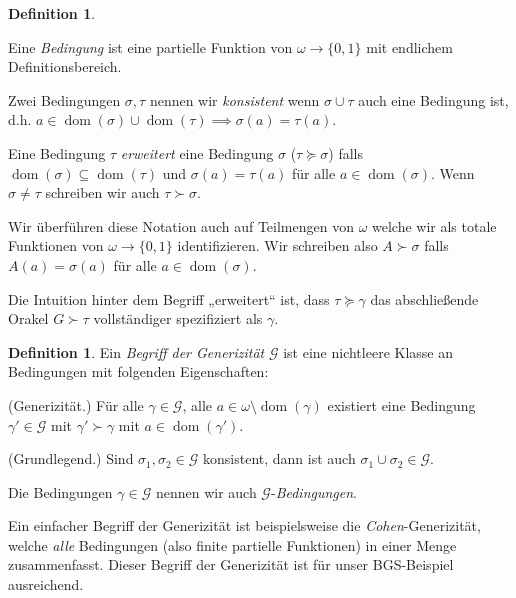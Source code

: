 \documentclass[nofonts]{uebung}
\theoremstyle{definition}
\newtheorem{definition}[theorem]{Definition}
\DeclareMathOperator{\dom}{dom}
\begin{document}
\begin{definition}\begin{thmenum}
    \item Eine \emph{Bedingung} ist eine partielle Funktion von $\omega \to \{0,1\}$ mit endlichem Definitionsbereich.
        \item Zwei Bedingungen $\sigma,\tau$ nennen wir \emph{konsistent} wenn $\sigma\cup\tau$ auch eine Bedingung ist, d.h. $a\in\dom(\sigma)\cup\dom(\tau)\implies \sigma(a)=\tau(a)$.
    \item Eine Bedingung $\tau$ \emph{erweitert} eine Bedingung $\sigma$ ($\tau\succeq \sigma$) falls $\dom(\sigma)\subseteq\dom(\tau)$ und $\sigma(a)=\tau(a)$ für alle $a\in\dom(\sigma)$.
    Wenn $\sigma\neq\tau$ schreiben wir auch $\tau\succ\sigma$.
    \item Wir überführen diese Notation auch auf Teilmengen von $\omega$ welche wir als totale Funktionen von $\omega\to\{0,1\}$ identifizieren.
    Wir schreiben also $A\succ \sigma$ falls $A(a)=\sigma(a)$ für alle $a\in\dom(\sigma)$.
\end{thmenum}
\end{definition}
Die Intuition hinter dem Begriff „erweitert“ ist, dass $\tau\succeq \gamma$ das abschließende Orakel $G\succ\tau$ vollständiger spezifiziert als $\gamma$.

\begin{definition}\label{def:generizität}
    Ein \emph{Begriff der Generizität} $\mathcal G$ ist eine nichtleere Klasse an Bedingungen mit folgenden Eigenschaften:
    \begin{thmenum}
        \item\label{def:generizität-ext} (Generizität.) Für alle $\gamma\in\mathcal G$, alle $a\in \omega\setminus\dom(\gamma)$ existiert eine Bedingung $\gamma'\in\mathcal G$ mit $\gamma'\succ \gamma$ mit $a\in\dom(\gamma')$.
        \item\label{def:generizität-grundlegend} (Grundlegend.) Sind $\sigma_1, \sigma_2\in\mathcal G$ konsistent, dann ist auch $\sigma_1\cup\sigma_2\in\mathcal G$.
    \end{thmenum}
    Die Bedingungen $\gamma\in \mathcal G$ nennen wir auch $\mathcal G$-\emph{Bedingungen}.
\end{definition}

Ein einfacher Begriff der Generizität ist beispielsweise die \emph{Cohen}-Generizität, welche \emph{alle} Bedingungen (also finite partielle Funktionen) in einer Menge zusammenfasst.
Dieser Begriff der Generizität ist für unser BGS-Beispiel ausreichend.
\end{document}
